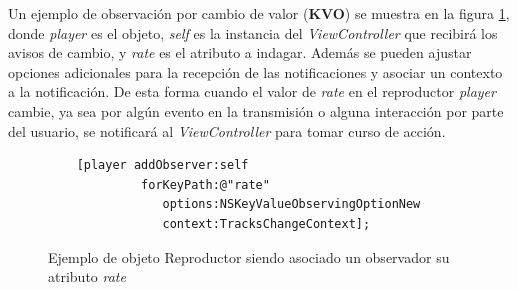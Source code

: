 Un ejemplo de observación por cambio de valor (\textbf{KVO}) se muestra en la figura \ref{exampleCodeObserver}, donde \textit{player} es el objeto, \textit{self} es la instancia del \textit{ViewController} que recibirá los avisos de cambio, y \textit{rate} es el atributo a indagar. Además se pueden ajustar opciones adicionales para la recepción de las notificaciones y asociar un contexto a la notificación. De esta forma cuando el valor de \textit{rate} en el reproductor \textit{player} cambie, ya sea por algún evento en la transmisión o alguna interacción por parte del usuario, se notificará al \textit{ViewController} para tomar curso de acción.
\begin{figure}[H]
	\centering
	\begin{lstlisting}
	[player addObserver:self  
			 forKeyPath:@"rate"
		        options:NSKeyValueObservingOptionNew
		        context:TracksChangeContext];
	\end{lstlisting}
	\caption{Ejemplo de objeto Reproductor siendo asociado un observador su atributo \textit{rate}}
	\label{exampleCodeObserver}	
\end{figure}	
 
